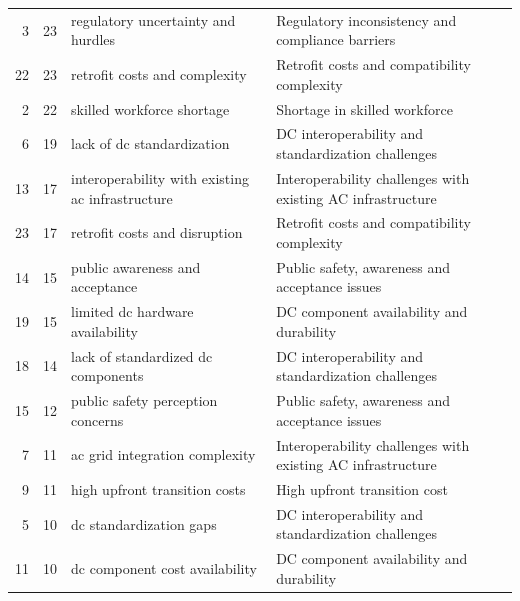 \begin{table}
\begin{tabular}{rrll}
3 & 23 & regulatory uncertainty and hurdles & Regulatory inconsistency and compliance barriers \\
22 & 23 & retrofit costs and complexity & Retrofit costs and compatibility complexity \\
2 & 22 & skilled workforce shortage & Shortage in skilled workforce \\
6 & 19 & lack of dc standardization & DC interoperability and standardization challenges \\
13 & 17 & interoperability with existing ac infrastructure & Interoperability challenges with existing AC infrastructure \\
23 & 17 & retrofit costs and disruption & Retrofit costs and compatibility complexity \\
14 & 15 & public awareness and acceptance & Public safety, awareness and acceptance issues \\
19 & 15 & limited dc hardware availability & DC component availability and durability \\
18 & 14 & lack of standardized dc components & DC interoperability and standardization challenges \\
15 & 12 & public safety perception concerns & Public safety, awareness and acceptance issues \\
7 & 11 & ac grid integration complexity & Interoperability challenges with existing AC infrastructure \\
9 & 11 & high upfront transition costs & High upfront transition cost \\
5 & 10 & dc standardization gaps & DC interoperability and standardization challenges \\
11 & 10 & dc component cost availability & DC component availability and durability \\
\bottomrule
\end{tabular}
\end{table}
